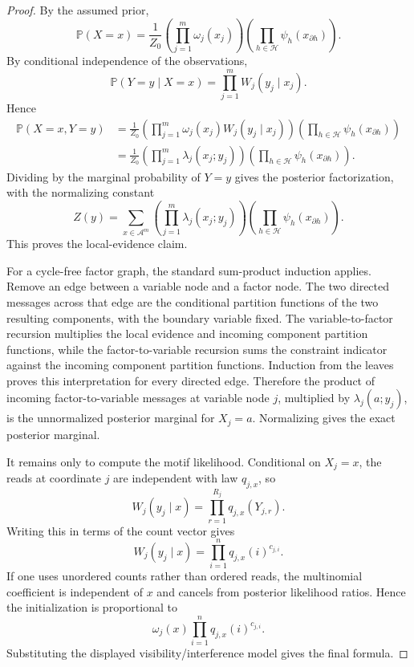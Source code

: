 \documentclass[11pt]{article}
\theoremstyle{definition}
\theoremstyle{remark}
\newcommand{\Pbb}{\mathbb P}
\newcommand{\1}{\mathbf 1}
\begin{document}
\begin{proof}
By the assumed prior,
\[
  \Pbb(X=x)=\frac1{Z_0}
  \left(\prod_{j=1}^m \omega_j(x_j)\right)
  \left(\prod_{h\in\mathcal H}\psi_h(x_{\partial h})\right).
\]
By conditional independence of the observations,
\[
  \Pbb(Y=y\mid X=x)=\prod_{j=1}^m W_j(y_j\mid x_j).
\]
Hence
\[
\begin{aligned}
  \Pbb(X=x,Y=y)
  &=\frac1{Z_0}
    \left(\prod_{j=1}^m \omega_j(x_j)W_j(y_j\mid x_j)\right)
    \left(\prod_{h\in\mathcal H}\psi_h(x_{\partial h})\right) \\
  &=\frac1{Z_0}
    \left(\prod_{j=1}^m \lambda_j(x_j;y_j)\right)
    \left(\prod_{h\in\mathcal H}\psi_h(x_{\partial h})\right).
\end{aligned}
\]
Dividing by the marginal probability of \(Y=y\) gives the posterior factorization, with the normalizing constant
\[
  Z(y)=\sum_{x\in\mathcal A^m}
  \left(\prod_{j=1}^m \lambda_j(x_j;y_j)\right)
  \left(\prod_{h\in\mathcal H}\psi_h(x_{\partial h})\right).
\]
This proves the local-evidence claim.

For a cycle-free factor graph, the standard sum-product induction applies.  Remove an edge between a variable node and a factor node.  The two directed messages across that edge are the conditional partition functions of the two resulting components, with the boundary variable fixed.  The variable-to-factor recursion multiplies the local evidence and incoming component partition functions, while the factor-to-variable recursion sums the constraint indicator against the incoming component partition functions.  Induction from the leaves proves this interpretation for every directed edge.  Therefore the product of incoming factor-to-variable messages at variable node \(j\), multiplied by \(\lambda_j(a;y_j)\), is the unnormalized posterior marginal for \(X_j=a\).  Normalizing gives the exact posterior marginal.

It remains only to compute the motif likelihood.  Conditional on \(X_j=x\), the reads at coordinate \(j\) are independent with law \(q_{j,x}\), so
\[
  W_j(y_j\mid x)=\prod_{r=1}^{R_j}q_{j,x}(Y_{j,r}).
\]
Writing this in terms of the count vector gives
\[
  W_j(y_j\mid x)=\prod_{i=1}^n q_{j,x}(i)^{c_{j,i}}.
\]
If one uses unordered counts rather than ordered reads, the multinomial coefficient is independent of \(x\) and cancels from posterior likelihood ratios.  Hence the initialization is proportional to
\[
  \omega_j(x)\prod_{i=1}^n q_{j,x}(i)^{c_{j,i}}.
\]
Substituting the displayed visibility/interference model gives the final formula.
\end{proof}
\end{document}
